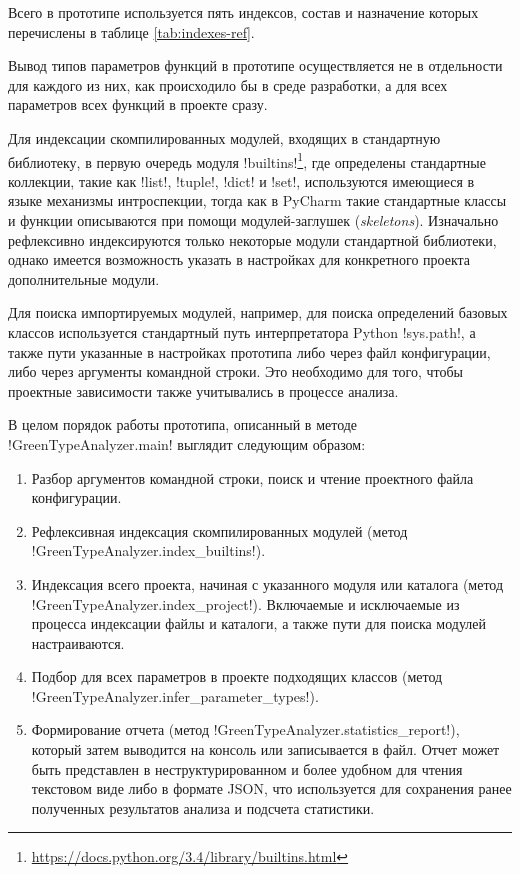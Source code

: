 Всего в прототипе используется пять индексов, состав и назначение которых
перечислены в таблице \ref{tab:indexes-ref}.

Вывод типов параметров функций в прототипе осуществляется не в отдельности для
каждого из них, как происходило бы в среде разработки, а для всех параметров
всех функций в проекте сразу.


Для индексации скомпилированных модулей, входящих в стандартную библиотеку, в
первую очередь модуля
!builtins!\footnote{\url{https://docs.python.org/3.4/library/builtins.html}},
где определены стандартные коллекции, такие как !list!, !tuple!, !dict! и !set!,
используются имеющиеся в языке механизмы интроспекции, тогда как в PyCharm
такие стандартные классы и функции описываются при помощи модулей-заглушек
(\emph{skeletons}).
Изначально рефлексивно индексируются только некоторые модули стандартной
библиотеки, однако имеется возможность указать в настройках для конкретного
проекта дополнительные модули.

Для поиска импортируемых модулей, например, для поиска определений базовых
классов используется стандартный путь интерпретатора Python !sys.path!, а также пути
указанные в настройках прототипа либо через файл конфигурации, либо через
аргументы командной строки. Это необходимо для того, чтобы проектные
зависимости также учитывались в процессе анализа.

В целом порядок работы прототипа, описанный в методе !GreenTypeAnalyzer.main! 
выглядит следующим образом:

\begin{enumerate}
    \item Разбор аргументов командной строки, поиск и чтение проектного файла
      конфигурации.

    \item Рефлексивная индексация скомпилированных модулей (метод
      !GreenTypeAnalyzer.index_builtins!).

    \item Индексация всего проекта, начиная с указанного модуля или каталога 
      (метод !GreenTypeAnalyzer.index_project!).
      Включаемые и исключаемые из процесса индексации файлы и каталоги, а также
      пути для поиска модулей настраиваются. 

    \item Подбор для всех параметров в проекте подходящих классов (метод
      !GreenTypeAnalyzer.infer_parameter_types!).

    \item Формирование отчета (метод !GreenTypeAnalyzer.statistics_report!),
      который затем выводится на консоль или записывается в файл. Отчет может
      быть представлен в неструктурированном и более удобном для чтения
      текстовом виде либо в формате JSON, что используется для сохранения ранее
      полученных результатов анализа и подсчета статистики. 

\end{enumerate}

